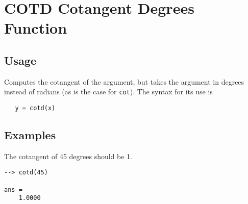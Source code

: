 \section{COTD Cotangent Degrees Function}

\subsection{Usage}

Computes the cotangent of the argument, but takes
the argument in degrees instead of radians (as is the case
for \verb|cot|). The syntax for its use is
\begin{verbatim}
   y = cotd(x)
\end{verbatim}
\subsection{Examples}

The cotangent of 45 degrees should be 1.
\begin{verbatim}
--> cotd(45)

ans = 
    1.0000 
\end{verbatim}
